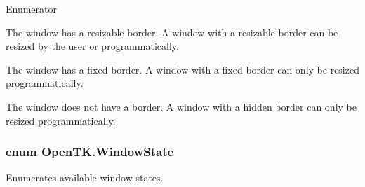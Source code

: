 \begin{Desc}
\item[Enumerator]\par
\begin{description}
\item[{\em 
\hypertarget{namespace_open_t_k_a20f46792b5471ff32362bd0a29fa5f1caaff10bf1618da00a8a80b74044e719b2}{Resizable}\label{namespace_open_t_k_a20f46792b5471ff32362bd0a29fa5f1caaff10bf1618da00a8a80b74044e719b2}
}]The window has a resizable border. A window with a resizable border can be resized by the user or programmatically. \item[{\em 
\hypertarget{namespace_open_t_k_a20f46792b5471ff32362bd0a29fa5f1ca4457d440870ad6d42bab9082d9bf9b61}{Fixed}\label{namespace_open_t_k_a20f46792b5471ff32362bd0a29fa5f1ca4457d440870ad6d42bab9082d9bf9b61}
}]The window has a fixed border. A window with a fixed border can only be resized programmatically. \item[{\em 
\hypertarget{namespace_open_t_k_a20f46792b5471ff32362bd0a29fa5f1ca7acdf85c69cc3c5305456a293524386e}{Hidden}\label{namespace_open_t_k_a20f46792b5471ff32362bd0a29fa5f1ca7acdf85c69cc3c5305456a293524386e}
}]The window does not have a border. A window with a hidden border can only be resized programmatically. \end{description}
\end{Desc}
\hypertarget{namespace_open_t_k_ace9268dc87bd36f48c9d9d8b939559b4}{
\subsubsection[{Window\-State}]{\setlength{\rightskip}{0pt plus 5cm}enum {\bf Open\-T\-K.\-Window\-State}}}\label{namespace_open_t_k_ace9268dc87bd36f48c9d9d8b939559b4}


Enumerates available window states. 

